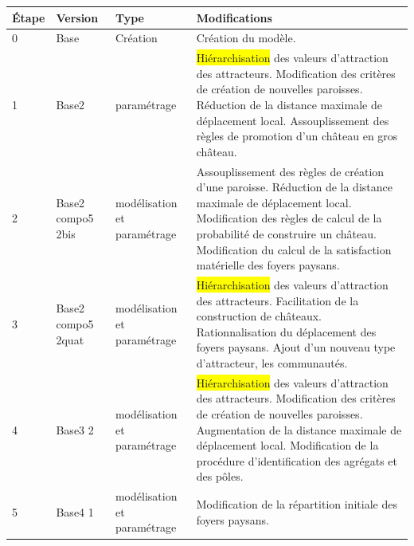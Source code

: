 \pagebreak
\begin{footnotesize}
	\begin{longtable}{ m{} m{} m{} m{}}
		Étape & Version & Type & Modifications \\
		\endhead \hline
		0 & Base & Création & Création du modèle. \fixref{Cf. tableau 14 de Tannier 2017} \\
		\hline
		1 & Base2 & paramétrage & \colorbox{yellow}{Hiérarchisation} des valeurs d'attraction des attracteurs. \newline
		Modification des critères de création de nouvelles paroisses. \newline
		Réduction de la distance maximale de déplacement local. \newline
		Assouplissement des règles de promotion d'un château en gros château. \\
		\hline
		2 & Base2 compo5 2bis & modélisation et paramétrage & Assouplissement des règles de création d'une paroisse.\newline
		Réduction de la distance maximale de déplacement local. \newline
		Modification des règles de calcul de la probabilité de construire un château.\newline
		Modification du calcul de la satisfaction matérielle des foyers paysans. \\
		\hline
		3 & Base2 compo5 2quat & modélisation et paramétrage & \colorbox{yellow}{Hiérarchisation} des valeurs d'attraction des attracteurs. \newline
		Facilitation de la construction de châteaux. \newline
		Rationnalisation du déplacement des foyers paysans. \newline
		Ajout d'un nouveau type d'attracteur, les communautés. \\
		\hline
		4 & Base3 2 & modélisation et paramétrage & \colorbox{yellow}{Hiérarchisation} des valeurs d'attraction des attracteurs. \newline
		Modification des critères de création de nouvelles paroisses. \newline
		Augmentation de la distance maximale de déplacement local. \newline
		Modification de la procédure d'identification des agrégats et des pôles. \\
		\hline
		5 & Base4 1 & modélisation et paramétrage & 
		Modification de la répartition initiale des foyers paysans.\newline

\end{longtable}
\end{footnotesize}
